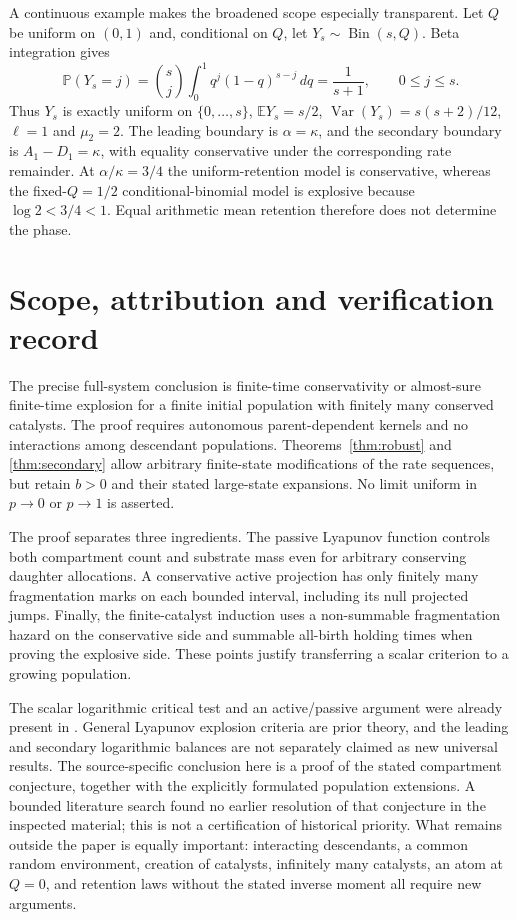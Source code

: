 \documentclass[11pt,a4paper]{article}
\theoremstyle{remark}\newtheorem{remark}[theorem]{Remark}
\DeclareMathOperator{\Var}{Var}
\newcommand{\E}{\mathbb E}
\newcommand{\Prob}{\mathbb P}
\begin{document}
A continuous example makes the broadened scope especially transparent. Let $Q$ be uniform on $(0,1)$ and, conditional on $Q$, let $Y_s\sim\operatorname{Bin}(s,Q)$. Beta integration gives
\[
\Prob(Y_s=j)=\binom{s}{j}\int_0^1q^j(1-q)^{s-j}\,dq=\frac1{s+1},
\qquad 0\le j\le s.
\]
Thus $Y_s$ is exactly uniform on $\{0,\ldots,s\}$,
$\E Y_s=s/2$, $\Var(Y_s)=s(s+2)/12$, $\ell=1$ and $\mu_2=2$.
The leading boundary is $\alpha=\kappa$, and the secondary boundary is
$A_1-D_1=\kappa$, with equality conservative under the corresponding rate
remainder. At $\alpha/\kappa=3/4$ the uniform-retention model is conservative,
whereas the fixed-$Q=1/2$ conditional-binomial model is explosive because
$\log2<3/4<1$. Equal arithmetic mean retention therefore does not determine the phase.


\section{Scope, attribution and verification record}\label{sec:scope}

The precise full-system conclusion is finite-time conservativity or almost-sure finite-time explosion for a finite initial population with finitely many conserved catalysts. The proof requires autonomous parent-dependent kernels and no interactions among descendant populations. Theorems~\ref{thm:robust} and \ref{thm:secondary} allow arbitrary finite-state modifications of the rate sequences, but retain $b>0$ and their stated large-state expansions. No limit uniform in $p\to0$ or $p\to1$ is asserted.

The proof separates three ingredients. The passive Lyapunov function controls both compartment count and substrate mass even for arbitrary conserving daughter allocations. A conservative active projection has only finitely many fragmentation marks on each bounded interval, including its null projected jumps. Finally, the finite-catalyst induction uses a non-summable fragmentation hazard on the conservative side and summable all-birth holding times when proving the explosive side. These points justify transferring a scalar criterion to a growing population.

The scalar logarithmic critical test and an active/passive argument were already present in \cite{anderson2026}. General Lyapunov explosion criteria are prior theory, and the leading and secondary logarithmic balances are not separately claimed as new universal results. The source-specific conclusion here is a proof of the stated compartment conjecture, together with the explicitly formulated population extensions. A bounded literature search found no earlier resolution of that conjecture in the inspected material; this is not a certification of historical priority. What remains outside the paper is equally important: interacting descendants, a common random environment, creation of catalysts, infinitely many catalysts, an atom at $Q=0$, and retention laws without the stated inverse moment all require new arguments.
\end{document}

